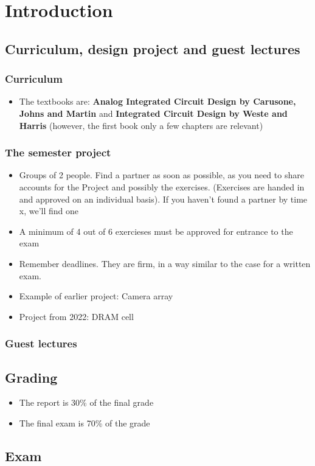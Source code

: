 \documentclass[a4paper,11pt,norsk]{article}
\begin{document}


\section{Introduction}
\subsection{Curriculum, design project and guest lectures}
\subsubsection{Curriculum}
\begin{itemize}
    \item The textbooks are: \textbf{Analog Integrated Circuit Design by Carusone, Johns and Martin} and \textbf{Integrated Circuit Design by Weste and Harris} (however, the first 
        book only a few chapters are relevant)
\end{itemize}

\subsubsection{The semester project}
\begin{itemize}
    \item Groups of 2 people. Find a partner as soon as possible, as you need to share accounts for the Project and possibly the exercises. (Exercises are handed in and approved 
        on an individual basis). If you haven't found a partner by time x, we'll find one
    \item A minimum of 4 out of 6 exercieses must be approved for entrance to the exam
    \item Remember deadlines. They are firm, in a way similar to the case for a written exam.
    \item Example of earlier project: Camera array
    \item Project from 2022: DRAM cell
\end{itemize}

\subsubsection{Guest lectures}


\subsection{Grading}
\begin{itemize}
    \item The report is 30\% of the final grade
    \item The final exam is 70\% of the grade
\end{itemize}

\subsection{Exam}
\end{document}
